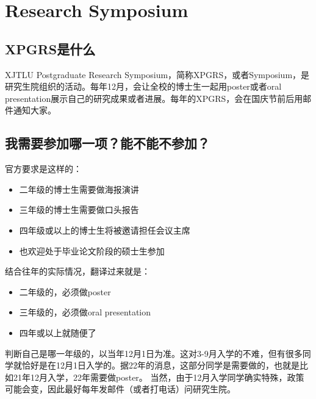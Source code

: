 \section{Research Symposium}

\subsection{XPGRS是什么}
XJTLU Postgraduate Research Symposium，简称XPGRS，或者Symposium，是研究生院组织的活动。每年12月，会让全校的博士生一起用poster或者oral presentation展示自己的研究成果或者进展。每年的XPGRS，会在国庆节前后用邮件通知大家。

\subsection{我需要参加哪一项？能不能不参加？}

官方要求是这样的：

\begin{itemize}
    \item 二年级的博士生需要做海报演讲
    \item 三年级的博士生需要做口头报告
    \item 四年级或以上的博士生将被邀请担任会议主席
    \item 也欢迎处于毕业论文阶段的硕士生参加
\end{itemize}

结合往年的实际情况，翻译过来就是：

\begin{itemize}
    \item 二年级的，必须做poster
    \item 三年级的，必须做oral presentation
    \item 四年或以上就随便了
\end{itemize}

判断自己是哪一年级的，以当年12月1日为准。这对3-9月入学的不难，但有很多同学就恰好是在12月1日入学的。据22年的消息，这部分同学是需要做的，也就是比如21年12月入学，22年需要做poster。
%
当然，由于12月入学同学确实特殊，政策可能会变，因此最好每年发邮件（或者打电话）问研究生院。

